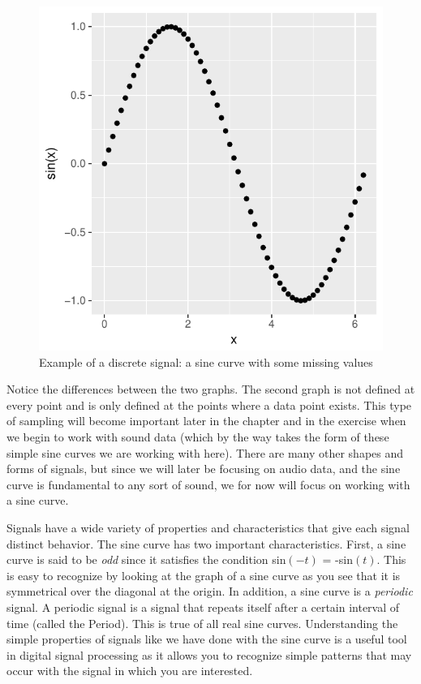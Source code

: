\documentclass[12pt,oneside]{book}\usepackage[]{graphicx}\usepackage[]{color}
\makeatletter
\def\maxwidth{ %
  \ifdim\Gin@nat@width>\linewidth
    \linewidth
  \else
    \Gin@nat@width
  \fi
}
\newenvironment{knitrout}{}{} %
\makeatother
\begin{document}
{{{{\begin{figure}[h]
\begin{center}
\begin{knitrout}
\color{fgcolor}
\includegraphics[width=\maxwidth]{figure/unnamed-chunk-304-1} 

\end{knitrout}
\caption{Example of a discrete signal: a sine curve with some missing values}
\label{FIG:DIGITAL}
\end{center}
\end{figure}

Notice the differences between the two graphs. The second graph is not defined at every point and is only defined at the points where a data point exists. This type of sampling will become important later in the chapter and in the exercise when we begin to work with sound data (which by the way takes the form of these simple sine curves we are working with here). There are many other shapes and forms of signals, but since we will later be focusing on audio data, and the sine curve is fundamental to any sort of sound, we for now will focus on working with a sine curve.

Signals have a wide variety of properties and characteristics that give each signal distinct behavior. The sine curve has two important characteristics. First, a sine curve is said to be \emph{odd} since it satisfies the condition sin$(-t)$ = -sin$(t)$. This is easy to recognize by looking at the graph of a sine curve as you see that it is symmetrical over the diagonal at the origin. In addition, a sine curve is a \emph{periodic} signal. A periodic signal is a signal that repeats itself after a certain interval of time (called the Period). This is true of all real sine curves. Understanding the simple properties of signals like we have done with the sine curve is a useful tool in digital signal processing as it allows you to recognize simple patterns that may occur with the signal in which you are interested. 

}}}}
\end{document}
